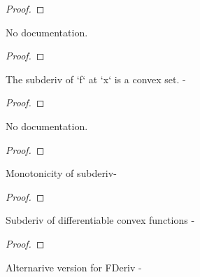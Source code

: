 \begin{proof}
    \leanok
\end{proof}

\begin{theorem}\label{SubderivWithinAt.isClosed}
        \leanok
                No documentation.
    \end{theorem}

\begin{proof}
    \leanok
\end{proof}

\begin{theorem}\label{SubderivAt.convex}
        \leanok
                The subderiv of `f` at `x` is a convex set. -
    \end{theorem}

\begin{proof}
    \leanok
\end{proof}

\begin{theorem}\label{SubderivWithinAt.convex}
        \leanok
                No documentation.
    \end{theorem}

\begin{proof}
    \leanok
\end{proof}

\begin{theorem}\label{subgradientAt_mono}
        \leanok
                Monotonicity of subderiv-
    \end{theorem}

\begin{proof}
    \leanok
\end{proof}

\begin{theorem}\label{SubderivWithinAt_eq_gradient}
        \leanok
                Subderiv of differentiable convex functions -
    \end{theorem}

\begin{proof}
    \leanok
\end{proof}

\begin{theorem}\label{SubderivWithinAt_eq_FDeriv}
        \leanok
                Alternarive version for FDeriv -
    \end{theorem}

